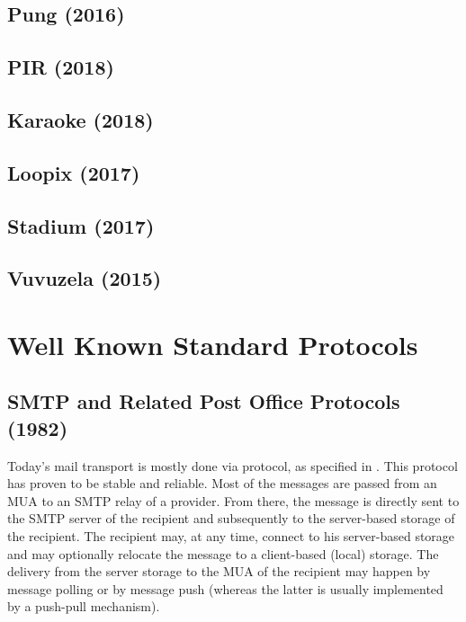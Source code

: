 \section{Pung (2016)}
\cite{angel2016unobservable}

%

\section{PIR (2018)}
\cite{angel2018pir}

%

\section{Karaoke (2018)}
\cite{lazar2018karaoke}

%

\section{Loopix (2017)}
\cite{piotrowska2017loopix}

%

\section{Stadium (2017)}
\cite{tyagi2017stadium}

%

\section{Vuvuzela (2015)}
\cite{van2015vuvuzela}

%

\chapter{Well Known Standard Protocols}
\section{SMTP and Related Post Office Protocols (1982)}
Today's mail transport is mostly done via  protocol, as specified in \cite{RFC5321}. This protocol has proven to be stable and reliable. Most of the messages are passed from an MUA to an SMTP relay of a provider. From there, the message is directly sent to the SMTP server of the recipient and subsequently to the server-based storage of the recipient. The recipient may, at any time, connect to his server-based storage and may optionally relocate the message to a client-based (local) storage. The delivery from the server storage to the MUA of the recipient may happen by message polling or by message push (whereas the latter is usually implemented by a push-pull mechanism).

